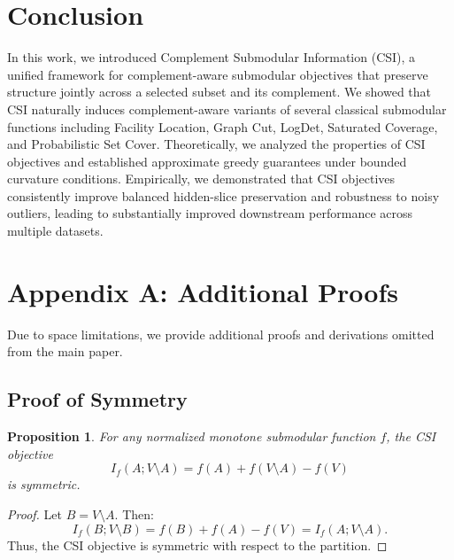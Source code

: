 \documentclass[11pt]{article}
\newtheorem{proposition}{Proposition}
\begin{document}
\section{Conclusion}
In this work, we introduced Complement Submodular Information (CSI), a unified framework for complement-aware submodular objectives that preserve structure jointly across a selected subset and its complement. We showed that CSI naturally induces complement-aware variants of several classical submodular functions including Facility Location, Graph Cut, LogDet, Saturated Coverage, and Probabilistic Set Cover. Theoretically, we analyzed the properties of CSI objectives and established approximate greedy guarantees under bounded curvature conditions. Empirically, we demonstrated that CSI objectives consistently improve balanced hidden-slice preservation and robustness to noisy outliers, leading to substantially improved downstream performance across multiple datasets. 






\newpage

\appendix

\section{Appendix A: Additional Proofs}
\label{appendix:proofs}

Due to space limitations, we provide additional proofs and derivations omitted from the main paper.

\subsection{Proof of Symmetry}

\begin{proposition}
For any normalized monotone submodular function $f$, the CSI objective
\[
I_f(A;V\setminus A)
=
f(A)+f(V\setminus A)-f(V)
\]
is symmetric.
\end{proposition}

\begin{proof}
Let $B=V\setminus A$. Then:
\[
I_f(B;V\setminus B)
=
f(B)+f(A)-f(V)
=
I_f(A;V\setminus A).
\]
Thus, the CSI objective is symmetric with respect to the partition.
\end{proof}
\end{document}
